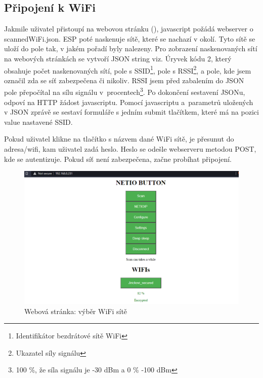 \documentclass[a4paper, 12pt]{report}
\begin{document}
    \subsection{Připojení k WiFi}
    Jakmile uživatel přistoupí na webovou stránku (), javascript požádá webserver o scannedWiFi.json.
    ESP poté naskenuje sítě, které se nachazí v okolí.
    Tyto sítě se uloží do pole tak, v jakém pořadí byly nalezeny.
    Pro zobrazení naskenovaných sítí na webových stránkách se vytvoří JSON string viz. Úryvek kódu 2, který obsahuje počet naskenovaných sítí, pole s SSID\footnote{Identifikátor bezdrátové sítě WiFi}, pole s RSSI\footnote{Ukazatel síly signálu}, a pole, kde jsem označil zda se síť zabezpečena či nikoliv.
    RSSI jsem před zabalením do JSON pole přepočítal na sílu signálu v~procentech\footnote{100 \%, že síla signálu je -30 dBm a 0 \% -100 dBm}.
    Po dokončení sestavení JSONu, odpoví na HTTP žádost javascriptu.
    Pomocí javascriptu a~parametrů uložených v JSON zprávě se sestaví formuláře s jedním submit tlačítkem, které má na pozici value nastavené SSID.\par
    Pokud uživatel klikne na tlačítko s názvem dané WiFi sítě, je přesunut do adresa/wifi, kam uživatel zadá heslo.
    Heslo se odešle webserveru metodou POST, kde se autentizuje.
    Pokud síť není zabezpečena, začne probíhat připojení.


    \begin{figure}
        \centering
        \includegraphics[width= 12cm]{images/webscreen}
        \caption{Webová stránka: výběr WiFi sítě}
        \label{fig:website}
    \end{figure}
    
\end{document}
